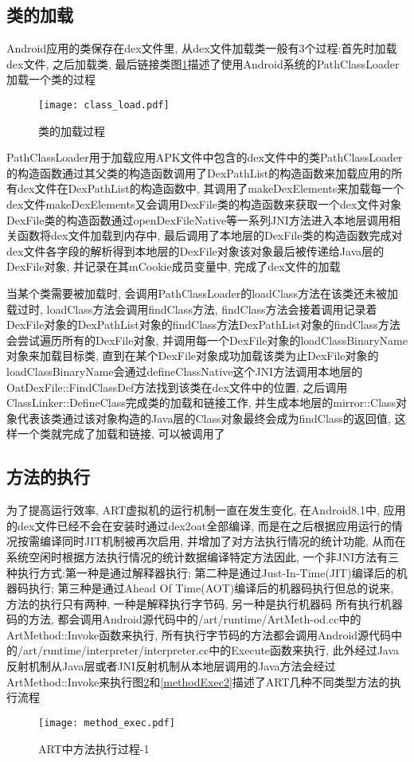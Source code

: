 \subsection{类的加载}
\label{classLoadA}
Android应用的类保存在dex文件里, 从dex文件加载类一般有3个过程:首先时加载dex文件, 之后加载类, 最后链接类\juhao 图\ref{classLoad}描述了使用Android系统的PathClassLoader加载一个类的过程\juhao 
\begin{figure}[ht]
	\centering
	\texttt{[image: class\_load.pdf]}
	\caption{类的加载过程}
	\label{classLoad}
\end{figure}
PathClassLoader用于加载应用APK文件中包含的dex文件中的类\juhao PathClassLoader的构造函数通过其父类的构造函数调用了DexPathList的构造函数来加载应用的所有dex文件\juhao 在DexPathList的构造函数中, 其调用了makeDexElements来加载每一个dex文件\juhao makeDexElements又会调用DexFile类的构造函数来获取一个dex文件对象\juhao DexFile类的构造函数通过openDexFileNative等一系列JNI方法进入本地层调用相关函数将dex文件加载到内存中, 最后调用了本地层的DexFile类的构造函数完成对dex文件各字段的解析得到本地层的DexFile对象\juhao 该对象最后被传递给Java层的DexFile对象, 并记录在其mCookie成员变量中, 完成了dex文件的加载\juhao

当某个类需要被加载时, 会调用PathClassLoader的loadClass方法\juhao 在该类还未被加载过时, loadClass方法会调用findClass方法, findClass方法会接着调用记录着DexFile对象的DexPathList对象的findClass方法\juhao DexPathList对象的findClass方法会尝试遍历所有的DexFile对象, 并调用每一个DexFile对象的loadClassBinaryName对象来加载目标类, 直到在某个DexFile对象成功加载该类为止\juhao DexFile对象的loadClassBinaryName会通过defineClassNative这个JNI方法调用本地层的OatDexFile::FindClassDef方法找到该类在dex文件中的位置, 之后调用ClassLinker::DefineClass完成类的加载和链接工作, 并生成本地层的mirror::Class对象代表该类\juhao 通过该对象构造的Java层的Class对象最终会成为findClass的返回值, 这样一个类就完成了加载和链接, 可以被调用了\juhao 

\subsection{方法的执行}
\label{methodExecA}
为了提高运行效率, ART虚拟机的运行机制一直在发生变化, 在Android8.1中, 应用的dex文件已经不会在安装时通过dex2oat全部编译, 而是在之后根据应用运行的情况按需编译\juhao 同时JIT机制被再次启用, 并增加了对方法执行情况的统计功能, 从而在系统空闲时根据方法执行情况的统计数据编译特定方法\juhao 因此, 一个非JNI方法有三种执行方式:第一种是通过解释器执行; 第二种是通过Just-In-Time(JIT)编译后的机器码执行; 第三种是通过Ahead Of Time(AOT)编译后的机器码执行\juhao 但总的说来, 方法的执行只有两种, 一种是解释执行字节码, 另一种是执行机器码\juhao 
所有执行机器码的方法, 都会调用Android源代码中的/art/runtime/ArtMeth-od.cc中的ArtMethod::Invoke函数来执行, 所有执行字节码的方法都会调用Android源代码中的/art/runtime/interpreter/interpreter.cc中的Execute函数来执行, 此外经过Java反射机制从Java层或者JNI反射机制从本地层调用的Java方法会经过ArtMethod::Invoke来执行\juhao 图\ref{methodExec}和\ref{methodExec2}描述了ART几种不同类型方法的执行流程\juhao 
\begin{figure}[]
	\centering
	\texttt{[image: method\_exec.pdf]}
	\caption{ART中方法执行过程-1}
	\label{methodExec}
\end{figure}

